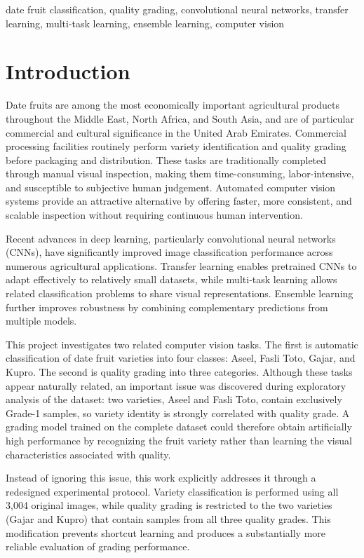 \documentclass[conference]{IEEEtran}
\begin{document}
\begin{IEEEkeywords}
date fruit classification, quality grading, convolutional neural networks, transfer learning, multi-task learning, ensemble learning, computer vision
\end{IEEEkeywords}

\section{Introduction}
Date fruits are among the most economically important agricultural products throughout the Middle East, North Africa, and South Asia, and are of particular commercial and cultural significance in the United Arab Emirates. Commercial processing facilities routinely perform variety identification and quality grading before packaging and distribution. These tasks are traditionally completed through manual visual inspection, making them time-consuming, labor-intensive, and susceptible to subjective human judgement. Automated computer vision systems provide an attractive alternative by offering faster, more consistent, and scalable inspection without requiring continuous human intervention.

Recent advances in deep learning, particularly convolutional neural networks (CNNs), have significantly improved image classification performance across numerous agricultural applications. Transfer learning enables pretrained CNNs to adapt effectively to relatively small datasets, while multi-task learning allows related classification problems to share visual representations. Ensemble learning further improves robustness by combining complementary predictions from multiple models.

This project investigates two related computer vision tasks. The first is automatic classification of date fruit varieties into four classes: Aseel, Fasli Toto, Gajar, and Kupro. The second is quality grading into three categories. Although these tasks appear naturally related, an important issue was discovered during exploratory analysis of the dataset: two varieties, Aseel and Fasli Toto, contain exclusively Grade-1 samples, so variety identity is strongly correlated with quality grade. A grading model trained on the complete dataset could therefore obtain artificially high performance by recognizing the fruit variety rather than learning the visual characteristics associated with quality.

Instead of ignoring this issue, this work explicitly addresses it through a redesigned experimental protocol. Variety classification is performed using all 3{,}004 original images, while quality grading is restricted to the two varieties (Gajar and Kupro) that contain samples from all three quality grades. This modification prevents shortcut learning and produces a substantially more reliable evaluation of grading performance.
\end{document}
